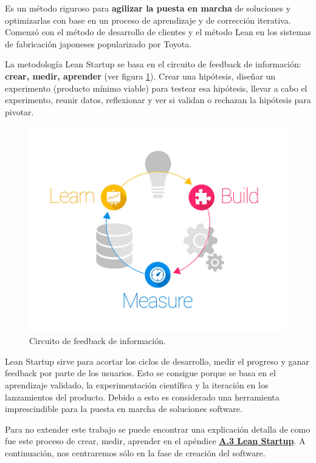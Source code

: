 \documentclass[12pt,twoside,titlepage]{report}
\begin{document}
Es un método riguroso para \textbf{agilizar la puesta en marcha} de soluciones y optimizarlas con base en un proceso de aprendizaje y de corrección iterativa. Comenzó con el método de desarrollo de clientes y el método Lean en los sistemas de fabricación japoneses popularizado por Toyota.

La metodología Lean Startup se basa en el circuito de feedback de información: \textbf{crear, medir, aprender} (ver figura \ref{fig:LeanStartup}). Crear una hipótesis, diseñar un experimento (producto mínimo viable) para testear esa hipótesis, llevar a cabo el experimento, reunir datos, reflexionar y ver si validan o rechazan la hipótesis para pivotar.
\cite{leanstartup1}

\begin{figure}[H]
    \centering
    \includegraphics[scale=0.3]{Lean Startup/CircuitoFeedback}
    \caption{Circuito de feedback de información.}
    \label{fig:LeanStartup}
\end{figure}

Lean Startup sirve para acortar los ciclos de desarrollo, medir el progreso y ganar feedback por parte de los usuarios. Esto se consigue porque se basa en el aprendizaje validado, la experimentación científica y la iteración en los lanzamientos del producto. 
Debido a esto es considerado una herramienta imprescindible para la puesta en marcha de soluciones software. 

Para no extender este trabajo se puede encontrar una explicación detalla de como fue este proceso de crear, medir, aprender en el apéndice \hyperref[sec:LeanStartup]{\textbf{A.3 Lean Startup}}. A continuación, nos centraremos sólo en la fase de creación del software.
\cite{leanstartup2}
\end{document}
